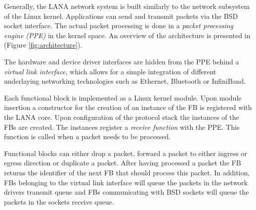\documentclass{sig-alternate}
\newcommand{\daniel}[1]{\textcolor{red}{\emph{DB: #1}}}
\begin{document}

Generally, the LANA network system is built similarly to the network subsystem of the Linux kernel.
Applications can send and transmit packets via the BSD socket interface. The actual packet processing is done in a \textit{packet processing engine (PPE)} in the kernel space. An overview of the architecture is presented in (Figure \ref{fig:architecture}).


The hardware and device driver interfaces are hidden from the PPE behind a \textit{virtual link interface}, which allows for a simple integration of different underlaying networking technologies such as Ethernet, Bluetooth or InfiniBand.

Each functional block is implemented as a Linux kernel module. 
Upon module insertion a constructor for the creation of an instance of the FB is registered with the LANA core. Upon configuration of the protocol stack the instances of the FBs are created. The instances register a \textit{receive function} with the PPE. This function is called when a packet needs to be processed.

Functional blocks can either drop a packet, forward a packet to either ingress or egress direction or duplicate a packet. After having processed a packet the FB returns the identifier of the next FB that should process this packet. In addition, FBs belonging to the virtual link interface will queue the packets in the network drivers transmit queue and FBs communicating with BSD sockets will queue the packets in the sockets receive queue.
\end{document}
